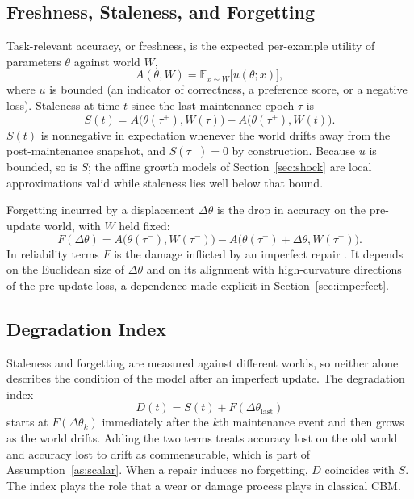\documentclass[journal]{IEEEtran}
\newcommand{\E}{\mathbb{E}}
\begin{document}
\subsection{Freshness, Staleness, and Forgetting}
Task-relevant accuracy, or freshness, is the expected per-example utility of parameters $\theta$ against world $W$,
\begin{equation}
A(\theta,W)=\E_{x\sim W}\big[u(\theta;x)\big],
\end{equation}
where $u$ is bounded (an indicator of correctness, a preference score, or a negative loss). Staleness at time $t$ since the last maintenance epoch $\tau$ is
\begin{equation}
S(t)=A\big(\theta(\tau^+),W(\tau)\big)-A\big(\theta(\tau^+),W(t)\big).
\end{equation}
$S(t)$ is nonnegative in expectation whenever the world drifts away from the post-maintenance snapshot, and $S(\tau^+)=0$ by construction. Because $u$ is bounded, so is $S$; the affine growth models of Section~\ref{sec:shock} are local approximations valid while staleness lies well below that bound.

Forgetting incurred by a displacement $\Delta\theta$ is the drop in accuracy on the pre-update world, with $W$ held fixed:
\begin{equation}
F(\Delta\theta)=A\big(\theta(\tau^-),W(\tau^-)\big)-A\big(\theta(\tau^-)+\Delta\theta,W(\tau^-)\big).
\end{equation}
In reliability terms $F$ is the damage inflicted by an imperfect repair \cite{pham1996}. It depends on the Euclidean size of $\Delta\theta$ and on its alignment with high-curvature directions of the pre-update loss, a dependence made explicit in Section~\ref{sec:imperfect}.

\subsection{Degradation Index}
Staleness and forgetting are measured against different worlds, so neither alone describes the condition of the model after an imperfect update. The degradation index
\begin{equation}
D(t)=S(t)+F(\Delta\theta_{\mathrm{last}})
\end{equation}
starts at $F(\Delta\theta_k)$ immediately after the $k$th maintenance event and then grows as the world drifts. Adding the two terms treats accuracy lost on the old world and accuracy lost to drift as commensurable, which is part of Assumption~\ref{as:scalar}. When a repair induces no forgetting, $D$ coincides with $S$. The index plays the role that a wear or damage process plays in classical CBM.
\end{document}
